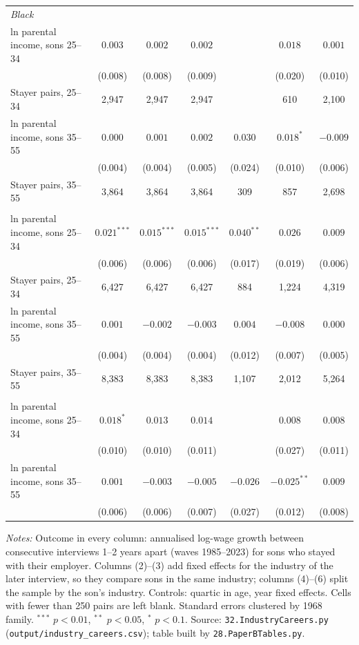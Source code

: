 \begin{table}[!htbp]
{{\begin{tabular}{lcccccc}
\multicolumn{7}{l}{\textit{Black}} \\
ln parental income, sons 25--34 & $0.003$ & $0.002$ & $0.002$ &  & $0.018$ & $0.001$ \\
 & (0.008) & (0.008) & (0.009) &  & (0.020) & (0.010) \\
\quad Stayer pairs, 25--34 & 2,947 & 2,947 & 2,947 &  & 610 & 2,100 \\
ln parental income, sons 35--55 & $0.000$ & $0.001$ & $0.002$ & $0.030$ & $0.018^{*}$ & $-0.009$ \\
 & (0.004) & (0.004) & (0.005) & (0.024) & (0.010) & (0.006) \\
\quad Stayer pairs, 35--55 & 3,864 & 3,864 & 3,864 & 309 & 857 & 2,698 \\
\addlinespace
\multicolumn{7}{l}{\textit{White}} \\
ln parental income, sons 25--34 & $0.021^{***}$ & $0.015^{***}$ & $0.015^{***}$ & $0.040^{**}$ & $0.026$ & $0.009$ \\
 & (0.006) & (0.006) & (0.006) & (0.017) & (0.019) & (0.006) \\
\quad Stayer pairs, 25--34 & 6,427 & 6,427 & 6,427 & 884 & 1,224 & 4,319 \\
ln parental income, sons 35--55 & $0.001$ & $-0.002$ & $-0.003$ & $0.004$ & $-0.008$ & $0.000$ \\
 & (0.004) & (0.004) & (0.004) & (0.012) & (0.007) & (0.005) \\
\quad Stayer pairs, 35--55 & 8,383 & 8,383 & 8,383 & 1,107 & 2,012 & 5,264 \\
\addlinespace
\multicolumn{7}{l}{\textit{White $-$ Black}} \\
ln parental income, sons 25--34 & $0.018^{*}$ & $0.013$ & $0.014$ &  & $0.008$ & $0.008$ \\
 & (0.010) & (0.010) & (0.011) &  & (0.027) & (0.011) \\
ln parental income, sons 35--55 & $0.001$ & $-0.003$ & $-0.005$ & $-0.026$ & $-0.025^{**}$ & $0.009$ \\
 & (0.006) & (0.006) & (0.007) & (0.027) & (0.012) & (0.008) \\
\bottomrule
\end{tabular}}}
\par\smallskip
\begin{minipage}{\textwidth}\footnotesize \textit{Notes:} Outcome in every column: annualised log-wage growth between consecutive interviews 1--2 years apart (waves 1985--2023) for sons who stayed with their employer. Columns (2)--(3) add fixed effects for the industry of the later interview, so they compare sons in the same industry; columns (4)--(6) split the sample by the son's industry. Controls: quartic in age, year fixed effects. Cells with fewer than 250 pairs are left blank. Standard errors clustered by 1968 family. $^{***}$ $p<0.01$, $^{**}$ $p<0.05$, $^{*}$ $p<0.1$. Source: \texttt{32.IndustryCareers.py} (\texttt{output/industry\_careers.csv}); table built by \texttt{28.PaperBTables.py}.\end{minipage}
\end{table}

